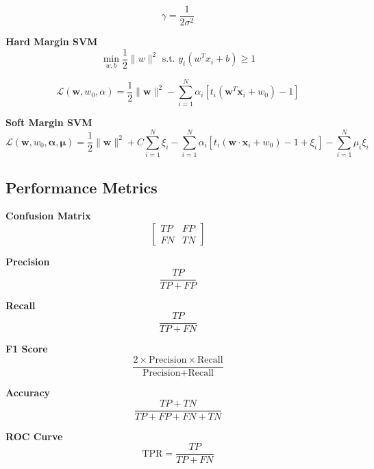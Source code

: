 \documentclass[8pt]{article}
\begin{document}
\begin{multicols}{2}
\begin{equation}
    \gamma = \frac{1}{2\sigma^2}
\end{equation}

\textbf{Hard Margin SVM}
\begin{equation}
    \min_{w, b} \frac{1}{2} \|w\|^2 \text{ s.t. } y_i(w^Tx_i + b) \geq 1
\end{equation}

\begin{equation}
    \mathcal{L}(\mathbf{w}, w_0, \alpha) = \frac{1}{2} \|\mathbf{w}\|^2 - \sum_{i=1}^{N} \alpha_i[t_i(\mathbf{w}^T\mathbf{x}_i + w_0) - 1]
\end{equation}

\textbf{Soft Margin SVM}
{\small
    \begin{equation}
        \mathcal{L}(\mathbf{w}, w_0, \mathbf{\alpha}, \mathbf{\mu}) = \frac{1}{2} \|\mathbf{w}\|^2 + C \sum_{i=1}^{N} \xi_i - \sum_{i=1}^{N} \alpha_i[t_i(\mathbf{w} \cdot \mathbf{x}_i + w_0) - 1 + \xi_i] - \sum_{i=1}^{N} \mu_i \xi_i
    \end{equation}
}

\subsection*{Performance Metrics}
\textbf{Confusion Matrix}
\begin{equation}
    \begin{bmatrix}
        TP & FP \\
        FN & TN
    \end{bmatrix}
\end{equation}

\textbf{Precision}
\begin{equation}
    \frac{TP}{TP + FP}
\end{equation}

\textbf{Recall}
\begin{equation}
    \frac{TP}{TP + FN}
\end{equation}

\textbf{F1 Score}
\begin{equation}
    \frac{2 \times \text{Precision} \times \text{Recall}}{\text{Precision} + \text{Recall}}
\end{equation}

\textbf{Accuracy}
\begin{equation}
    \frac{TP + TN}{TP + FP + FN + TN}
\end{equation}

\textbf{ROC Curve}
\begin{equation}
    \text{TPR} = \frac{TP}{TP + FN}
\end{equation}


\end{multicols}
\end{document}
